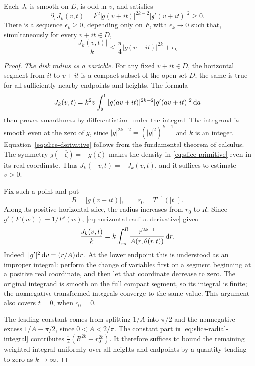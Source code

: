 \begin{proposition}\label{prop:uniform-slice}
Each $J_k$ is smooth on $D$, is odd in $v$, and satisfies
\begin{equation}\label{eq:slice-derivative}
 \partial_v J_k(v,t)
    =k^2|g(v+it)|^{2k-2}|g'(v+it)|^2\ge0.
\end{equation}
There is a sequence $\epsilon_k\ge0$, depending only on $F$, with $\epsilon_k\to0$ such that, simultaneously for every $v+it\in D$,
\begin{equation}\label{eq:uniform-slice}
 \frac{|J_k(v,t)|}{k}
    \le\frac{\pi}{4}|g(v+it)|^{2k}+\epsilon_k.
\end{equation}
\end{proposition}

\begin{proof}
\noindent\emph{The disk radius as a variable.} For any fixed $v+it\in D$, the horizontal segment from $it$ to $v+it$ is a compact subset of the open set $D$; the same is true for all sufficiently nearby endpoints and heights.  The formula
\[
 J_k(v,t)=k^2v\int_0^1
       |g(av+it)|^{2k-2}|g'(av+it)|^2\,\mathrm{d} a
\]
then proves smoothness by differentiation under the integral. The integrand is smooth even at the zero of $g$, since $|g|^{2k-2}=(|g|^2)^{k-1}$ and $k$ is an integer. Equation~\eqref{eq:slice-derivative} follows from the fundamental theorem of calculus.  The symmetry $g(-\overline\zeta)=-\overline{g(\zeta)}$ makes the density in \eqref{eq:slice-primitive} even in its real coordinate.  Thus $J_k(-v,t)=-J_k(v,t)$, and it suffices to estimate $v>0$.

Fix such a point and put
\[
 R=|g(v+it)|,\qquad r_0=T^{-1}(|t|).
\]
Along its positive horizontal slice, the radius increases from $r_0$ to $R$.  Since $g'(F(w))=1/F'(w)$, \eqref{eq:horizontal-radius-derivative} gives
\begin{equation}\label{eq:slice-radial-integral}
 \frac{J_k(v,t)}{k}
    =k\int_{r_0}^{R}
       \frac{r^{2k-1}}{A(r,\theta(r,t))}\,\mathrm{d} r.
\end{equation}
Indeed, $|g'|^2\,\mathrm{d} v=(r/A)\,\mathrm{d} r$. At the lower endpoint this is understood as an improper integral: perform the change of variables first on a segment beginning at a positive real coordinate, and then let that coordinate decrease to zero. The original integrand is smooth on the full compact segment, so its integral is finite; the nonnegative transformed integrals converge to the same value.  This argument also covers $t=0$, when $r_0=0$.

The leading constant comes from splitting $1/A$ into $\pi/2$ and the nonnegative excess $1/A-\pi/2$, since $0<A<2/\pi$. The constant part in \eqref{eq:slice-radial-integral} contributes $\frac{\pi}{4}(R^{2k}-r_0^{2k})$.  It therefore suffices to bound the remaining weighted integral uniformly over all heights and endpoints by a quantity tending to zero as $k\to\infty$.


\end{proof}
